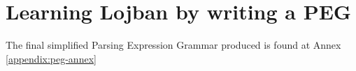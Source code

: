 \chapter{Learning Lojban by writing a PEG}
\label{chap:writing-a-peg}

The final simplified Parsing Expression Grammar produced is found at
Annex \ref{appendix:peg-annex}